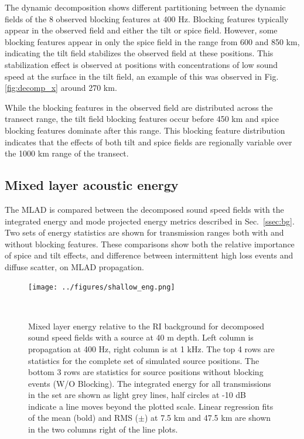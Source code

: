 \documentclass[preprint,NumberedRefs]{JASA}
\begin{document}
The dynamic decomposition shows different partitioning between the dynamic fields of the 8 observed blocking features at 400 Hz. Blocking features typically appear in the observed field and either the tilt or spice field. However, some blocking features appear in only the spice field in the range from 600 and 850 km, indicating the tilt field stabilizes the observed field at these positions. This stabilization effect is observed at positions with concentrations of low sound speed at the surface in the tilt field, an example of this was observed in Fig. \ref{fig:decomp_x} around 270 km.

While the blocking features in the observed field are distributed across the transect range, the tilt field blocking features occur before 450 km and spice blocking features dominate after this range. This blocking feature distribution indicates that the effects of both tilt and spice fields are regionally variable over the 1000 km range of the transect.

\subsection{Mixed layer acoustic energy}\label{ssec:energy}
The MLAD is compared between the decomposed sound speed fields with the integrated energy and mode projected energy metrics described in Sec.~\ref{ssec:bg}. Two sets of energy statistics are shown for transmission ranges both with and without blocking features. These comparisons show both the relative importance of spice and tilt effects, and difference between intermittent high loss events and diffuse scatter, on MLAD propagation.

\begin{figure}
\texttt{[image: ../figures/shallow\_eng.png]}
    \caption{Mixed layer energy relative to the RI background for decomposed sound speed fields with a source at 40 m depth. Left column is propagation at 400 Hz, right column is at 1 kHz. The top 4 rows are statistics for the complete set of simulated source positions. The bottom 3 rows are statistics for source positions without blocking events (W/O Blocking). The integrated energy for all transmissions in the set are shown as light grey lines, half circles at -10 dB indicate a line moves beyond the plotted scale. Linear regression fits of the mean (bold) and RMS ($\pm$) at 7.5 km and 47.5 km are shown in the two columns right of the line plots.}
    \label{fig:shal_eng}
\end{figure}
\end{document}
